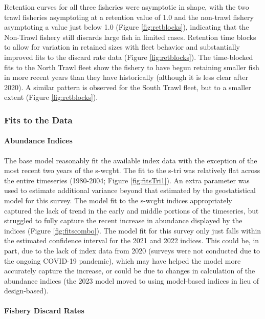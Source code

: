 \documentclass[11pt,
  english,
  letterpaper,
]{article}
\begin{document}
Retention curves for all three fisheries were asymptotic in shape, with the two trawl fisheries asymptoting at a retention value of 1.0 and the non-trawl fishery asymptoting a value just below 1.0 (Figure \ref{fig:retblocks}), indicating that the Non-Trawl fishery still discards large fish in limited cases. Retention time blocks to allow for variation in retained sizes with fleet behavior and substantially improved fits to the discard rate data (Figure \ref{fig:retblocks}). The time-blocked fits to the North Trawl fleet show the fishery to have begun retaining smaller fish in more recent years than they have historically (although it is less clear after 2020). A similar pattern is observed for the South Trawl fleet, but to a smaller extent (Figure \ref{fig:retblocks}).

\hypertarget{fits-to-the-data}{%
\subsubsection{Fits to the Data}\label{fits-to-the-data}}

\hypertarget{abundance-indices}{%
\paragraph{Abundance Indices}\label{abundance-indices}}

The base model reasonably fit the available index data with the exception of the most recent two years of the \gls{s-wcgbt}. The fit to the \gls{s-tri} was relatively flat across the entire timeseries (1980-2004; Figure \ref{fig:fitsTri1}). An extra parameter was used to estimate additional variance beyond that estimated by the geostatistical model for this survey. The model fit to the \gls{s-wcgbt} indices appropriately captured the lack of trend in the early and middle portions of the timeseries, but struggled to fully capture the recent increase in abundance displayed by the indices (Figure \ref{fig:fitscombo}). The model fit for this survey only just falls within the estimated confidence interval for the 2021 and 2022 indices. This could be, in part, due to the lack of index data from 2020 (surveys were not conducted due to the ongoing COVID-19 pandemic), which may have helped the model more accurately capture the increase, or could be due to changes in calculation of the abundance indices (the 2023 model moved to using model-based indices in lieu of design-based).

\hypertarget{fishery-discard-rates}{%
\paragraph{Fishery Discard Rates}\label{fishery-discard-rates}}
\end{document}
